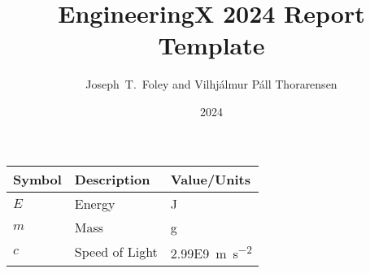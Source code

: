 \documentclass[showtrims]{rubook}
\title{EngineeringX 2024 Report Template}
\author{Joseph~T.~Foley and Vilhjálmur Páll Thorarensen}
\date{2024}{1}{24}%
\begin{document}
\maketitle{}
\disableindents{}%
\copyrightpage{}

\tableofcontents{}
\listoffigures{}
\listoftables{}
\begin{tabular}{lll}\toprule
  Symbol &Description &Value/Units\\\midrule
  $E$ &Energy &\si{\joule}\\ %
  $m$ &Mass &\si{\gram}\\ %
  $c$ &Speed of Light &\SI{2.99E9}{\meter\per\square\second}\\\bottomrule
\end{tabular}
\end{document}
